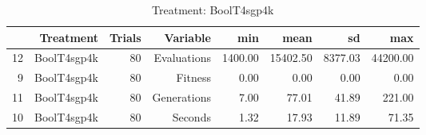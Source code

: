 \begin{table}[ht]
\centering
\begin{tabular}{rrrrrrrr}
  \hline
 & Treatment & Trials & Variable & min & mean & sd & max \\ 
  \hline
12 & BoolT4sgp4k &  80 & Evaluations & 1400.00 & 15402.50 & 8377.03 & 44200.00 \\ 
  9 & BoolT4sgp4k &  80 & Fitness & 0.00 & 0.00 & 0.00 & 0.00 \\ 
  11 & BoolT4sgp4k &  80 & Generations & 7.00 & 77.01 & 41.89 & 221.00 \\ 
  10 & BoolT4sgp4k &  80 & Seconds & 1.32 & 17.93 & 11.89 & 71.35 \\ 
   \hline
\end{tabular}
\caption{Treatment: BoolT4sgp4k} 
\end{table}
